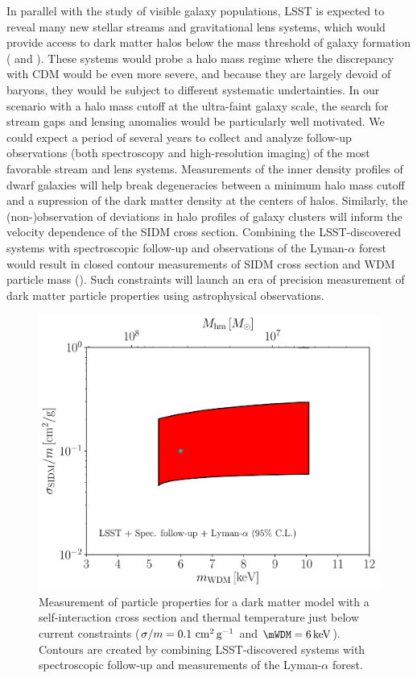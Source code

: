 In parallel with the study of visible galaxy populations, LSST is expected to reveal many new stellar streams and gravitational lens systems, which would provide access to dark matter halos below the mass threshold of galaxy formation ( and ).
These systems would probe a halo mass regime where the discrepancy with CDM would be even more severe, and because they are largely devoid of baryons, they would be subject to different systematic undertainties.
In our scenario with a halo mass cutoff at the ultra-faint galaxy scale, the search for stream gaps and lensing anomalies would be particularly well motivated.
We could expect a period of several years to collect and analyze follow-up observations (both spectroscopy and high-resolution imaging) of the most favorable stream and lens systems.
Measurements of the inner density profiles of dwarf galaxies will help break degeneracies between a minimum halo mass cutoff and a supression of the dark matter density at the centers of halos.
Similarly, the (non-)observation of deviations in halo profiles of galaxy clusters will inform the velocity dependence of the SIDM cross section.
Combining the LSST-discovered systems with spectroscopic follow-up and observations of the Lyman-$\alpha$ forest would result in closed contour measurements of SIDM cross section and WDM particle mass (\citep{sidm_wdm_disc}).
Such constraints will launch an era of precision measurement of dark matter particle properties using astrophysical observations.

\begin{figure}
\centering
\includegraphics[width=0.6\columnwidth]{figures/SIDM_WDM_fig_disc.pdf}
\caption{\label{fig:sidm_wdm_disc} Measurement of particle properties for a dark matter model with a self-interaction cross section and thermal temperature just below current constraints ($\sigma/m = 0.1 \mathrm{\,\mathrm{\,cm}^2\mathrm{\,g}^{-1}}$ and $\mWDM = 6\keV$). Contours are created by combining LSST-discovered systems with spectroscopic follow-up and measurements of the Lyman-$\alpha$ forest.
 
}
\end{figure}


